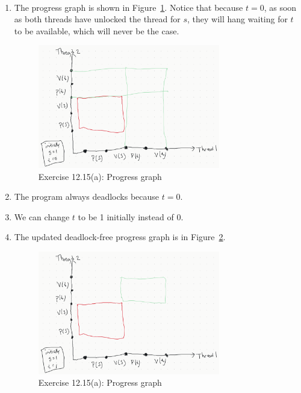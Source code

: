 \documentclass[12pt]{article}
\newenvironment{sol}[1][Solution]{\begin{trivlist}
		\item[\hskip \labelsep {\bfseries #1:}]}{\end{trivlist}}
\begin{document}
\begin{sol}
	\
	\begin{enumerate}[label=(\alph*)]
		\item The progress graph is shown in Figure~\ref{fig:ex-12-15a}. Notice that
		because $t=0$, as soon as both threads have unlocked the thread for $s$, they will
		hang waiting for $t$ to be available, which will never be the case.
		\begin{figure}
			\centering
			\includegraphics[width=0.75\textwidth]{exercise-12-15-progress-graph-deadlock}
			\caption{Exercise 12.15(a): Progress graph}
			\label{fig:ex-12-15a}
		\end{figure}
		\item The program always deadlocks because $t=0$.
		\item We can change $t$ to be 1 initially instead of 0.
		\item The updated deadlock-free progress graph is in Figure~\ref{fig:ex-12-15b}.
		\begin{figure}
			\centering
			\includegraphics[width=0.75\textwidth]{exercise-12-15-progress-graph-deadlock-free}
			\caption{Exercise 12.15(a): Progress graph}
			\label{fig:ex-12-15b}
		\end{figure}
	\end{enumerate}
\end{sol}
\end{document}
